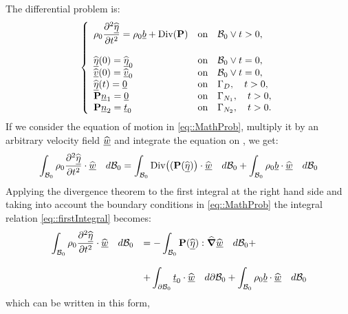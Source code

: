 The differential problem is:
\begin{equation}
  \left\{
    \begin{array}{lllllll} \displaystyle
      \rho_0\frac{\partial^2\widehat{\underline{\eta}}}{\partial
        t^2}=\rho_0\underline{b}+\text{Div}(\textbf{P}) & \text{on} \quad \mathcal{B}_0
      \vee t>0,\\ \\ \widehat{\underline{\eta}}(0)=\widehat{\underline{\eta}}_0 & \text{on} \quad \mathcal{B}_0 \vee
      t=0,\\ \widehat{\underline{v}}(0)=\widehat{\underline{v}}_0 & \text{on} \quad \mathcal{B}_0 \vee t=0,\\
      \widehat{\underline{\eta}}(t)=\underline{0} & \text{on} \quad \Gamma_D, \quad t>0,\\
      \textbf{P}\underline{n}_1=\underline{0} & \text{on} \quad \Gamma_{N_1},
      \quad t>0,\\ \textbf{P}\underline{n}_2=\underline{t}_0 & \text{on} \quad
      \Gamma_{N_2}, \quad t>0.\\
    \end{array}\right.
  \label{eq::MathProb}
\end{equation}
If we consider the equation of motion in
\eqref{eq::MathProb}, multiply it by an arbitrary velocity field
$\widehat{\underline{w}}$ and integrate the equation on \RefCon, we get:
\begin{equation}
  \displaystyle
  \int_{\mathcal{B}_0}\rho_0\frac{\partial^2
    \widehat{\underline{\eta}}}{\partial t^2}\cdot\widehat{\underline{w}}\quad d\mathcal{B}_0 =
  \int_{\mathcal{B}_0}\text{Div}\big((\textbf{P}(\widehat{\underline{\eta}})\big)\cdot\widehat{\underline{w}}\quad d\mathcal{B}_0 +
  \int_{\mathcal{B}_0}\rho_0\underline{b}\cdot\widehat{\underline{w}}\quad d\mathcal{B}_0
  \label{eq::firstIntegral}
\end{equation}
Applying the divergence theorem to the first integral
at the right hand side and taking into account the boundary conditions
in \eqref{eq::MathProb} the integral relation
\eqref{eq::firstIntegral} becomes:
\begin{equation}
  \begin{array}{lll} \displaystyle
    \int_{\mathcal{B}_0}\rho_0\frac{\partial^2 \widehat{\underline{\eta}}}{\partial
      t^2}\cdot\widehat{\underline{w}}\quad d\mathcal{B}_0 & = \displaystyle -
    \int_{\mathcal{B}_0}\textbf{P}(\widehat{\underline{\eta}}):\widehat{\boldsymbol{\nabla}}\widehat{\underline{w}}\quad d\mathcal{B}_0 + \\ \\ &
    \displaystyle + \int_{\partial
      \mathcal{B}_0}\underline{t}_0\cdot\widehat{\underline{w}}\quad d\partial\mathcal{B}_0 +
    \int_{\mathcal{B}_0}\rho_0 \underline{b}\cdot\widehat{\underline{w}}\quad d\mathcal{B}_0
  \end{array}
  \label{eq::secondIntegral}
\end{equation}
which can be written in this form,
